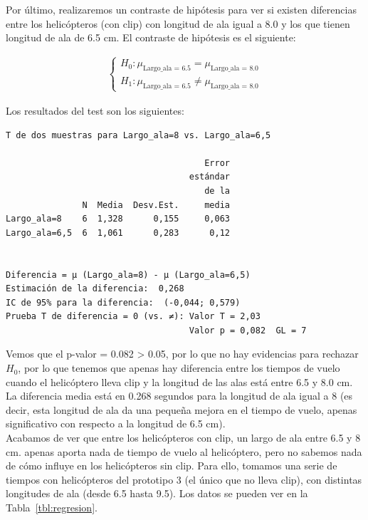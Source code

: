 \documentclass[12pt,a4paper,twoside,openright,titlepage,final]{article}
\begin{document}
Por último, realizaremos un contraste de hipótesis para ver si existen diferencias entre los helicópteros (con clip) con longitud de ala igual a 8.0 y los que tienen longitud de ala de 6.5 cm. El contraste de hipótesis es el siguiente:

\begin{eqnarray*}
	\begin{cases}
		H_0: \mu_{\text{Largo\_ala = 6.5}} = \mu_{\text{Largo\_ala = 8.0}} \\
		H_1: \mu_{\text{Largo\_ala = 6.5}} \neq \mu_{\text{Largo\_ala = 8.0}}
	\end{cases}
\end{eqnarray*}

Los resultados del test son los siguientes:

\begin{verbatim}
T de dos muestras para Largo_ala=8 vs. Largo_ala=6,5

                                       Error
                                    estándar
                                       de la
               N  Media  Desv.Est.     media
Largo_ala=8    6  1,328      0,155     0,063
Largo_ala=6,5  6  1,061      0,283      0,12


Diferencia = μ (Largo_ala=8) - μ (Largo_ala=6,5)
Estimación de la diferencia:  0,268
IC de 95% para la diferencia:  (-0,044; 0,579)
Prueba T de diferencia = 0 (vs. ≠): Valor T = 2,03  
                                    Valor p = 0,082  GL = 7
\end{verbatim}

Vemos que el p-valor = 0.082 > 0.05, por lo que no hay evidencias para rechazar $H_0$, por lo que tenemos que apenas hay diferencia entre los tiempos de vuelo cuando el helicóptero lleva clip y la longitud de las alas está entre 6.5 y 8.0 cm. La diferencia media está en 0.268 segundos para la longitud de ala igual a 8 (es decir, esta longitud de ala da una pequeña mejora en el tiempo de vuelo, apenas significativo con respecto a la longitud de 6.5 cm).\\

Acabamos de ver que entre los helicópteros con clip, un largo de ala entre 6.5 y 8 cm. apenas aporta nada de tiempo de vuelo al helicóptero, pero no sabemos nada de cómo influye en los helicópteros sin clip. Para ello, tomamos una serie de tiempos con helicópteros del prototipo 3 (el único que no lleva clip), con distintas longitudes de ala (desde 6.5 hasta 9.5). Los datos se pueden ver en la Tabla~\ref{tbl:regresion}.\\
\end{document}
